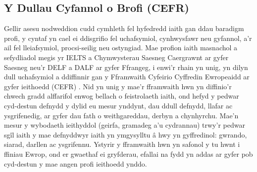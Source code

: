 \subsection{Y Dullau Cyfannol o Brofi (CEFR)}

Gellir asesu nodweddion cudd cymhleth fel hyfedredd iaith gan ddau baradigm profi, y cyntaf yn cael ei ddisgrifio fel uchafsymiol, cynhwysfawr neu gyfannol, a'r ail fel lleiafsymiol, procsi-seilig neu ostyngiad. Mae profion iaith masnachol a sefydliadol megis yr IELTS a Chymwysterau Saesneg Caergrawnt ar gyfer Saesneg neu'r DELF a DALF ar gyfer Ffrangeg, i enwi'r rhain yn unig, yn dilyn dull uchafsymiol a ddiffinnir gan y Fframwaith Cyfeirio Cyffredin Ewropeaidd ar gyfer ieithoedd (CEFR) \parencite{europe_common_2020}. Nid yn unig y mae'r fframwaith hwn yn diffinio'r chwech gradd alffarifol enwog bellach o feistrolaeth iaith, ond hefyd y pedwar cyd-destun defnydd y dylid eu mesur ynddynt, dau ddull defnydd, llafar ac ysgrifenedig, ar gyfer dau fath o weithgareddau, derbyn a chynhyrchu. Mae'n mesur y wybodaeth ieithyddol (geirfa, gramadeg a'u cydrannau) trwy'r pedwar sgîl iaith y mae defnyddwyr iaith yn ymgysylltu â hwy yn gyffredinol: gwrando, siarad, darllen ac ysgrifennu. Ystyrir y fframwaith hwn yn safonol y tu hwnt i ffiniau Ewrop, ond er gwaethaf ei gryfderau, efallai na fydd yn addas ar gyfer pob cyd-destun y mae angen profi ieithoedd ynddo.

